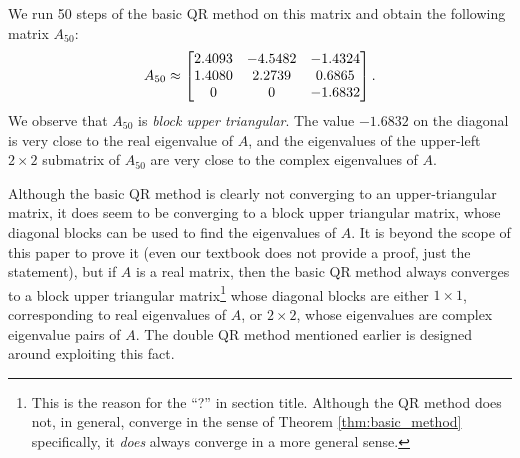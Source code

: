 \documentclass{article}
\begin{document}
We run 50 steps of the basic QR method on this matrix and obtain the following matrix $A_{50}$:
\begin{equation*}
	A_{50} \approx \left[\begin{matrix}
		2.4093  &  -4.5482 &  -1.4324 \\
		1.4080  &  2.2739  &  0.6865 \\
		0  & 0  & -1.6832
	\end{matrix}\right].
\end{equation*}
We observe that $A_{50}$ is \emph{block upper triangular}. The value $-1.6832$ on the diagonal is very close to the real eigenvalue of $A$, and the eigenvalues of the upper-left $2\times 2$ submatrix of $A_{50}$ are very close to the complex eigenvalues of $A$.

Although the basic QR method is clearly not converging to an upper-triangular matrix, it does seem to be converging to a block upper triangular matrix, whose diagonal blocks can be used to find the eigenvalues of $A$. It is beyond the scope of this paper to prove it (even our textbook \cite{ackleh_2009} does not provide a proof, just the statement), but if $A$ is a real matrix, then the basic QR method always converges to a block upper triangular matrix\footnote{This is the reason for the ``?'' in section title. Although the QR method does not, in general, converge in the sense of Theorem \ref{thm:basic_method} specifically, it \emph{does} always converge in a more general sense.} whose diagonal blocks are either $1\times 1$, corresponding to real eigenvalues of $A$, or $2\times 2$, whose eigenvalues are complex eigenvalue pairs of $A$. The double QR method mentioned earlier is designed around exploiting this fact.
\end{document}

